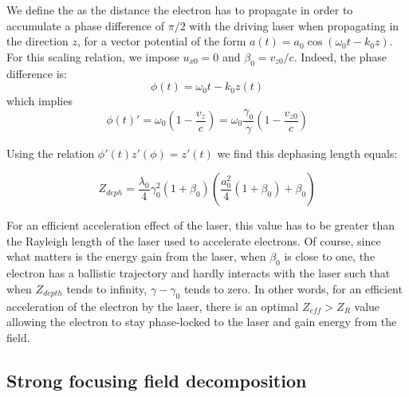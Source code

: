 


\noindent We define the  as the distance the electron has to propagate in order to accumulate a phase difference of $\pi/2$ with the driving laser when propagating in the direction $z$, for a vector potential of the form $a(t) = a_0\cos (\omega_0t -k_0z)$.
For this scaling relation, we impose $u_{x0} = 0$ and $\beta_0 = v_{z0}/c$. 
 Indeed, the phase difference is:
$$
\phi(t) = \omega_0 t- k_0 z(t) 
$$
\noindent which implies 
$$
\phi(t)' = \omega_0(1 - \frac{v_z}{c}) = \omega_0\frac{\gamma_0}{\gamma}(1 - \frac{v_{z0}}{c}) 
$$

\noindent Using the relation $\phi'(t)z'(\phi) = z'(t)$ we find this dephasing length equals:
%

\begin{equation}
Z_{deph} = \frac{\lambda_0}{4}\gamma_0^2(1+\beta_0)(\frac{a_0^2}{4}(1+\beta_0)+\beta_0)
\end{equation}

\noindent For an efficient acceleration effect of the laser, this value has to be greater than the Rayleigh length of the laser used to accelerate electrons. Of course, since what matters is the energy gain from the laser, when $\beta_0$ is close to one, the electron has a ballistic trajectory and hardly interacts with the laser such that when $Z_{depth}$ tends to infinity, $\gamma - \gamma_0$ tends to zero. In other words, for an efficient acceleration of the electron by the laser, there is an optimal $Z_{eff}>Z_R$ value allowing the electron to stay phase-locked to the laser and gain energy from the field.




\subsection{Strong focusing field decomposition}\label{subsection:First orders field decomposition for strong laser focus}

